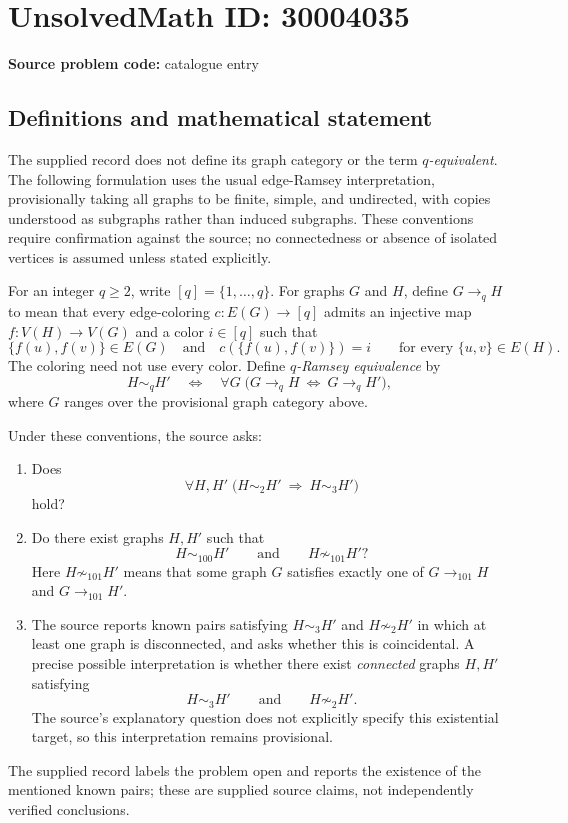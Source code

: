 \documentclass[11pt]{article}
\begin{document}
\section*{UnsolvedMath ID: 30004035}
\textbf{Source problem code:} catalogue entry
\subsection{Definitions and mathematical statement}
The supplied record does not define its graph category or the term \emph{$q$-equivalent}. The following formulation uses the usual edge-Ramsey interpretation, provisionally taking all graphs to be finite, simple, and undirected, with copies understood as subgraphs rather than induced subgraphs. These conventions require confirmation against the source; no connectedness or absence of isolated vertices is assumed unless stated explicitly.

For an integer $q\geq 2$, write $[q]=\{1,\ldots,q\}$. For graphs $G$ and $H$, define $G\longrightarrow_q H$ to mean that every edge-coloring $c:E(G)\to[q]$ admits an injective map $f:V(H)\to V(G)$ and a color $i\in[q]$ such that
\[
\{f(u),f(v)\}\in E(G)
\quad\text{and}\quad
c(\{f(u),f(v)\})=i
\qquad\text{for every }\{u,v\}\in E(H).
\]
The coloring need not use every color. Define \emph{$q$-Ramsey equivalence} by
\[
H\sim_q H'
\quad\Longleftrightarrow\quad
\forall G\;\bigl(G\longrightarrow_q H\ \Longleftrightarrow\ G\longrightarrow_q H'\bigr),
\]
where $G$ ranges over the provisional graph category above.

Under these conventions, the source asks:
\begin{enumerate}
\item Does
\[
\forall H,H'\;\bigl(H\sim_2 H'\ \Longrightarrow\ H\sim_3 H'\bigr)
\]
hold?
\item Do there exist graphs $H,H'$ such that
\[
H\sim_{100}H'
\qquad\text{and}\qquad
H\not\sim_{101}H'?
\]
Here $H\not\sim_{101}H'$ means that some graph $G$ satisfies exactly one of $G\longrightarrow_{101}H$ and $G\longrightarrow_{101}H'$.
\item The source reports known pairs satisfying $H\sim_3 H'$ and $H\not\sim_2 H'$ in which at least one graph is disconnected, and asks whether this is coincidental. A precise possible interpretation is whether there exist \emph{connected} graphs $H,H'$ satisfying
\[
H\sim_3 H'\qquad\text{and}\qquad H\not\sim_2 H'.
\]
The source's explanatory question does not explicitly specify this existential target, so this interpretation remains provisional.
\end{enumerate}
The supplied record labels the problem open and reports the existence of the mentioned known pairs; these are supplied source claims, not independently verified conclusions.
\end{document}
